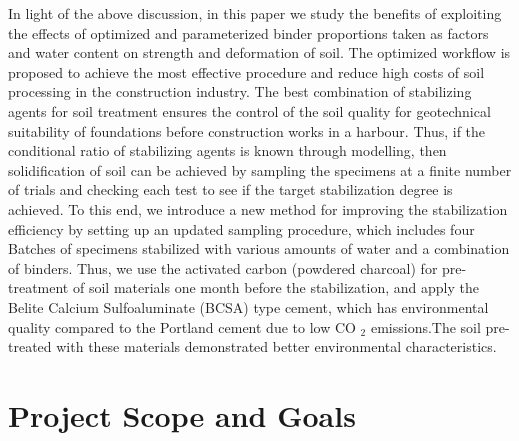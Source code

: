 \documentclass[sustainability,article,accept,pdftex,moreauthors]{Definitions/mdpi}
\begin{document}

In light of the above discussion, in this paper we study the benefits of exploiting the effects of optimized {and parameterized }binder proportions {taken as factors }and water content on strength and deformation of soil. The optimized workflow is proposed to achieve the most effective procedure and reduce high costs of soil processing in the construction industry. The best combination of stabilizing agents for soil treatment ensures the control of the soil quality for geotechnical suitability of foundations before construction works in a harbour. {Thus, if the conditional ratio of stabilizing agents is known through modelling, then solidification of soil can be achieved by sampling the specimens at a finite number of trials and checking each test to see if the target stabilization degree is achieved. }To this end, we introduce a new method for improving the stabilization efficiency by setting up an updated sampling procedure, which includes four Batches of specimens {stabilized with various amounts of water and a combination of binders}. Thus, we use the activated carbon (powdered charcoal) for pre-treatment of soil materials one month before the stabilization, and apply the Belite Calcium Sulfoaluminate (BCSA) type cement, which has environmental quality compared to the Portland cement due to low CO%
$_2$ emissions.\linebreak  The soil pre-treated with these materials demonstrated better environmental characteristics. 

\section{Project Scope and Goals}
\end{document}
